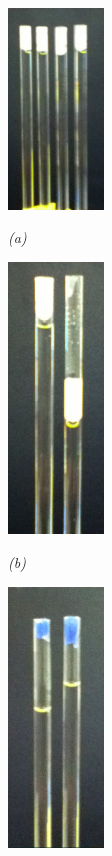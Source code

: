 \begin{figure}[htb]
  \begin{minipage}[b]{1in}
    \centering
    \centerline{\mbox{\includegraphics[width=1in]{phantom/images/tube_sealings/paraffin_and_floable_silicon.eps}}}
    \centerline{\emph{(a)}}
  \end{minipage}
  \begin{minipage}[b]{1in}
    \centering
    \centerline{\mbox{\includegraphics[width=1in]{phantom/images/tube_sealings/paraffin.eps}}}
    \centerline{\emph{(b)}}
  \end{minipage}
  \begin{minipage}[b]{1in}
    \centering
    \centerline{\mbox{\includegraphics[width=1in]{phantom/images/tube_sealings/machinable_wax.eps}}}

\end{minipage}
\end{figure}
